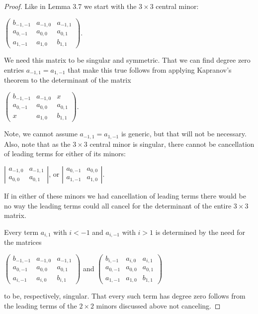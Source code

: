 \documentclass{article}
\begin{document}
\begin{proof}
  Like in Lemma 3.7 we start with the $3 \times 3$ central minor:
  \begin{center}
    $\left(\begin{array}{ccc} b_{-1,-1} & a_{-1,0} & a_{-1,1} \\ a_{0,-1} & a_{0,0} & a_{0,1} \\ a_{1,-1} & a_{1,0} & b_{1,1} \end{array}\right)$. 
  \end{center}
  We need this matrix to be singular and symmetric. That we can find degree zero entries $a_{-1,1} = a_{1,-1}$ that make this true follows from applying Kapranov's theorem to the determinant of the matrix
  \begin{center}
    $\left(\begin{array}{ccc} b_{-1,-1} & a_{-1,0} & x \\ a_{0,-1} & a_{0,0} & a_{0,1} \\ x & a_{1,0} & b_{1,1} \end{array}\right)$.
  \end{center}   
  Note, we cannot assume $a_{-1,1} = a_{1,-1}$ is generic, but that will not be necessary. Also, note that as the $3 \times 3$ central minor is singular, there cannot be cancellation of leading terms for either of its minors:
  \begin{center}
    $\left|\begin{array}{cc} a_{-1,0} & a_{-1,1} \\ a_{0,0} & a_{0,1} \end{array}\right|$, \hspace{.1 in} or \hspace{.1 in } $\left|\begin{array}{cc} a_{0,-1} & a_{0,0} \\ a_{1,-1} & a_{1,0} \end{array}\right|$.
  \end{center}
  If in either of these minors we had cancellation of leading terms there would be no way the leading terms could all cancel for the determinant of the entire $3 \times 3$ matrix.
  
  Every term $a_{i,1}$ with $i < -1$ and $a_{i,-1}$ with $i > 1$ is determined by the need for the matrices
  \begin{center}
    $\left(\begin{array}{ccc} b_{-1,-1} & a_{-1,0} & a_{-1,1} \\ a_{0,-1} & a_{0,0} & a_{0,1} \\ a_{i,-1} & a_{i,0} & b_{i,1} \end{array}\right)$ \hspace{.1 in} and \hspace{.1 in} $\left(\begin{array}{ccc} b_{i,-1} & a_{i,0} & a_{i,1} \\ a_{0,-1} & a_{0,0} & a_{0,1} \\ a_{1,-1} & a_{1,0} & b_{1,1} \end{array}\right)$  
  \end{center} 
  to be, respectively, singular. That every such term has degree zero follows from the leading terms of the $2 \times 2$ minors discussed above not canceling.
  

\end{proof}
\end{document}
